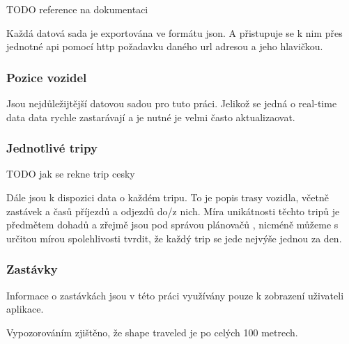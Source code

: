 TODO reference na dokumentaci

\bigbreak

Každá datová sada je exportována ve formátu \gls{json}. A přistupuje se k nim přes jednotné \gls{api} pomocí \gls{http} požadavku daného \gls{url} adresou a jeho hlavičkou.

\subsubsection{Pozice vozidel}

Jsou nejdůležijtější datovou sadou pro tuto práci. Jelikož se jedná o real-time data data rychle zastarávají a je nutné je velmi často aktualizaovat.

\subsubsection{Jednotlivé tripy} TODO jak se rekne trip cesky

Dále jsou k dispozici data o každém tripu. To je popis trasy vozidla, včetně zastávek a časů příjezdů a odjezdů do/z nich. Míra unikátnosti těchto tripů je předmětem dohadů a zřejmě jsou pod správou plánovačů , nicméně můžeme s určitou mírou spolehlivosti tvrdit, že každý trip se jede nejvýše jednou za den.

\subsubsection{Zastávky}

Informace o zastávkách jsou v této práci využívány pouze k zobrazení uživateli aplikace.




















Vypozorováním zjištěno, že shape traveled je po celých 100 metrech.
